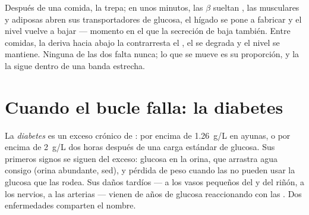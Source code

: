 \begin{example}\label{ex:g12:glucose-and-diabetes:loop}
Después de una comida, la  trepa; en unos minutos, las 
$\beta$ sueltan , las  musculares y adiposas abren sus
transportadores de glucosa, el hígado se pone a fabricar  y el
nivel vuelve a bajar --- momento en el que la secreción de 
baja también. Entre comidas, la deriva hacia abajo la contrarresta el
, el  se degrada y el nivel se mantiene. Ninguna de
las dos  falta nunca; lo que se mueve es su proporción, y la
 la sigue dentro de una banda estrecha.
\end{example}

\section{Cuando el bucle falla: la diabetes}

\begin{definition}[Diabetes]\label{def:g12:glucose-and-diabetes:diabetes}
La \emph{diabetes} es un exceso crónico de :
por encima de \qty{1.26}{g/L} en ayunas, o por encima de \qty{2}{g/L}
dos horas después de una carga estándar de glucosa. Sus primeros signos
se siguen del exceso: glucosa en la orina, que arrastra agua consigo
(orina abundante, sed), y pérdida de peso cuando las  no pueden
usar la glucosa que las rodea. Sus daños tardíos --- a los vasos
pequeños del  y del riñón, a los nervios, a las arterias --- vienen
de años de glucosa reaccionando con las . Dos enfermedades
comparten el nombre.
\end{definition}

